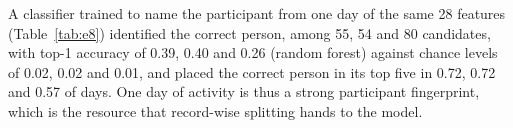 A classifier trained to name the participant from one day of the same 28 features (Table~\ref{tab:e8}) identified the correct person, among 55, 54 and 80 candidates, with top-1 accuracy of 0.39, 0.40 and 0.26 (random forest) against chance levels of 0.02, 0.02 and 0.01, and placed the correct person in its top five in 0.72, 0.72 and 0.57 of days. One day of activity is thus a strong participant fingerprint, which is the resource that record-wise splitting hands to the model.
